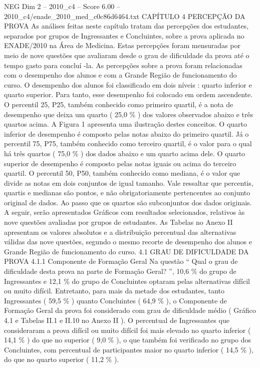 \begin{textsample}{NEG Dim 2 – 2010\_c4 – Score 6.00 – 2010\_c4/enade\_2010\_med\_c0c86d6464.txt}  \label{ex:f2_neg_293}
CAPÍTULO 4 PERCEPÇÃO DA PROVA As análises feitas neste capítulo tratam das percepções dos estudantes, separados por grupos de Ingressantes e Concluintes, sobre a prova aplicada no ENADE/2010 na Área de Medicina.
Estas percepções foram mensuradas por meio de nove questões que avaliaram desde o grau de dificuldade da prova até o tempo gasto para concluí -la.
As percepções sobre a prova foram relacionadas com o desempenho dos alunos e com a Grande Região de funcionamento do curso.
O desempenho dos alunos foi classificado em dois níveis : quarto inferior e quarto superior.
Para tanto, esse desempenho foi colocado em ordem ascendente.
O percentil 25, P25, também conhecido como primeiro quartil, é a nota de desempenho que deixa um quarto ( 25,0 \% ) dos valores observados abaixo e três quartos acima.
A Figura 1 apresenta uma ilustração destes conceitos.
O quarto inferior de desempenho é composto pelas notas abaixo do primeiro quartil.
Já o percentil 75, P75, também conhecido como terceiro quartil, é o valor para o qual há três quartos ( 75,0 \% ) dos dados abaixo e um quarto acima dele.
O quarto superior de desempenho é composto pelas notas iguais ou acima do terceiro quartil.
O percentil 50, P50, também conhecido como mediana, é o valor que divide as notas em dois conjuntos de igual tamanho.
Vale ressaltar que percentis, quartis e medianas são pontos, e não obrigatoriamente pertencentes ao conjunto original de dados.
Ao passo que os quartos são subconjuntos dos dados originais.
A seguir, serão apresentados Gráficos com resultados selecionados, relativos às nove questões avaliadas por grupos de estudantes.
As Tabelas no Anexo II apresentam os valores absolutos e a distribuição percentual das alternativas válidas das nove questões, segundo o mesmo recorte de desempenho dos alunos e Grande Região de funcionamento do curso. 4.1 GRAU DE DIFICULDADE DA PROVA 4.1.1 Componente de Formação Geral Na questão “ Qual o grau de dificuldade desta prova na parte de Formação Geral? ”, 10,6 \% do grupo de Ingressantes e 12,1 \% do grupo de Concluintes optaram pelas alternativas difícil ou muito difícil.
Entretanto, para mais da metade dos estudantes, tanto Ingressantes ( 59,5 \% ) quanto Concluintes ( 64,9 \% ), o Componente de Formação Geral da prova foi considerado com grau de dificuldade médio ( Gráfico 4.1 e Tabelas II.1 e II.10 no Anexo II ).
O percentual de Ingressantes que consideraram a prova difícil ou muito difícil foi mais elevado no quarto inferior ( 14,1 \% ) do que no superior ( 9,0 \% ), o que também foi verificado no grupo dos Concluintes, com percentual de participantes maior no quarto inferior ( 14,5 \% ), do que no quarto superior ( 11,2 \% ).

\end{textsample}
